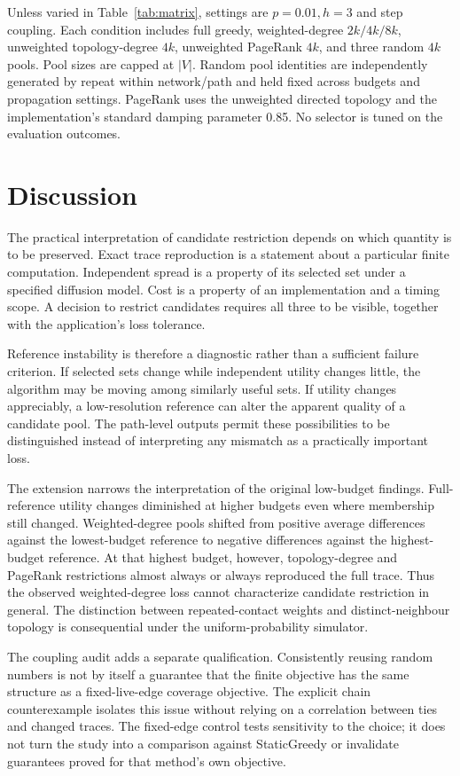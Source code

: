 Unless varied in Table~\ref{tab:matrix}, settings are $p=0.01,h=3$ and step coupling. Each condition includes full greedy, weighted-degree $2k/4k/8k$, unweighted topology-degree $4k$, unweighted PageRank $4k$, and three random $4k$ pools. Pool sizes are capped at $|V|$. Random pool identities are independently generated by repeat within network/path and held fixed across budgets and propagation settings. PageRank uses the unweighted directed topology and the implementation's standard damping parameter 0.85. No selector is tuned on the evaluation outcomes.


\FloatBarrier

\section{Discussion}
The practical interpretation of candidate restriction depends on which quantity is to be preserved. Exact trace reproduction is a statement about a particular finite computation. Independent spread is a property of its selected set under a specified diffusion model. Cost is a property of an implementation and a timing scope. A decision to restrict candidates requires all three to be visible, together with the application's loss tolerance.

Reference instability is therefore a diagnostic rather than a sufficient failure criterion. If selected sets change while independent utility changes little, the algorithm may be moving among similarly useful sets. If utility changes appreciably, a low-resolution reference can alter the apparent quality of a candidate pool. The path-level outputs permit these possibilities to be distinguished instead of interpreting any mismatch as a practically important loss.

The extension narrows the interpretation of the original low-budget findings. Full-reference utility changes diminished at higher budgets even where membership still changed. Weighted-degree pools shifted from positive average differences against the lowest-budget reference to negative differences against the highest-budget reference. At that highest budget, however, topology-degree and PageRank restrictions almost always or always reproduced the full trace. Thus the observed weighted-degree loss cannot characterize candidate restriction in general. The distinction between repeated-contact weights and distinct-neighbour topology is consequential under the uniform-probability simulator.

The coupling audit adds a separate qualification. Consistently reusing random numbers is not by itself a guarantee that the finite objective has the same structure as a fixed-live-edge coverage objective. The explicit chain counterexample isolates this issue without relying on a correlation between ties and changed traces. The fixed-edge control tests sensitivity to the choice; it does not turn the study into a comparison against StaticGreedy or invalidate guarantees proved for that method's own objective.

